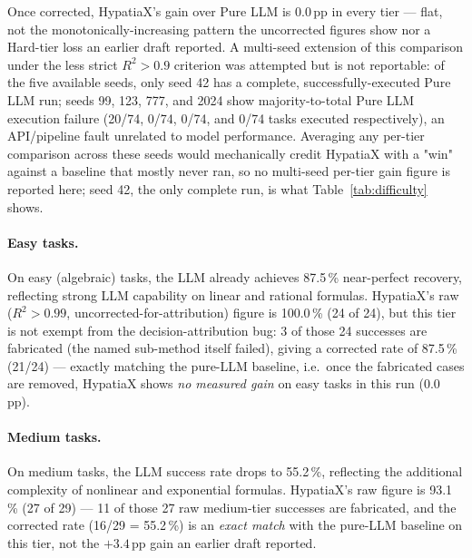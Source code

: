 \documentclass[twoside,11pt]{article}
\newcommand{\Rsq}{R^{2}}
\begin{document}
Once corrected, HypatiaX's gain over Pure LLM is $0.0$\,pp in every tier ---
flat, not the monotonically-increasing pattern the uncorrected figures show
nor a Hard-tier loss an earlier draft reported. A multi-seed extension of
this comparison under the less strict $\Rsq>0.9$ criterion was attempted but
is not reportable: of the five available seeds, only seed 42 has a complete,
successfully-executed Pure LLM run; seeds 99, 123, 777, and 2024 show
majority-to-total Pure LLM execution failure (20/74, 0/74, 0/74, and 0/74
tasks executed respectively), an API/pipeline fault unrelated to model
performance. Averaging any per-tier comparison across these seeds would
mechanically credit HypatiaX with a "win" against a baseline that mostly
never ran, so no multi-seed per-tier gain figure is reported here; seed 42,
the only complete run, is what Table~\ref{tab:difficulty} shows.

\paragraph{Easy tasks.}
On easy (algebraic) tasks, the LLM already achieves 87.5\,\% near-perfect recovery,
reflecting strong LLM capability on linear and rational formulas. HypatiaX's
raw ($\Rsq>0.99$, uncorrected-for-attribution) figure is 100.0\,\% (24 of 24),
but this tier is not exempt from the decision-attribution bug: 3 of those 24
successes are fabricated (the named sub-method itself failed), giving a
corrected rate of 87.5\,\% (21/24) --- exactly matching
the pure-LLM baseline, i.e.\ once the fabricated cases are removed, HypatiaX shows
\emph{no measured gain} on easy tasks in this run ($0.0$\,pp).

\paragraph{Medium tasks.}
On medium tasks, the LLM success rate drops to 55.2\,\%, reflecting the additional
complexity of nonlinear and exponential formulas. HypatiaX's raw figure is 93.1\,\%
(27 of 29) --- 11 of those 27 raw medium-tier successes are fabricated, and the
corrected rate (16/29 = 55.2\,\%) is an \emph{exact match} with the pure-LLM
baseline on this tier, not the $+3.4$\,pp gain an earlier draft reported.
\end{document}
